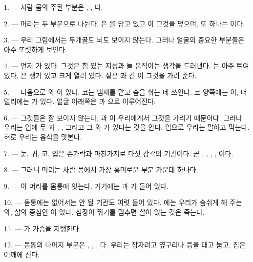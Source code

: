 \VUsaut{3.0mm}

1. --- 사람 몸의 주된 부분은 , , 다.

2. --- 머리는 두 부분으로 나뉜다. 은 를 담고 있고
이 그것을 덮으며, 또 하나는 이다.

3. --- 우리 그림에서는 두개골도 뇌도 보이지 않는다. 그러나 얼굴의 중요한 부분들은 아주
또렷하게 보인다.

4. --- 먼저 가 있다. 그것은 힘 있는 지성과 늘 움직이는 생각을 드러낸다.
는 아주 트여 있다. 은 생기 있고 크게 열려 있다. 짙은
과 긴 이 그것을 가려 준다.

5. --- 다음으로 와 이 있다. 코는 냄새를 맡고 숨을 쉬는 데
쓰인다. 코 양쪽에는 이, 더 멀리에는 가 있다. 얼굴 아래쪽은
과 으로 이루어진다.

6. --- 그것들은 잘 보이지 않는다. 과 이 우리에게서
그것을 가리기 때문이다. 그러나 우리는 입에 두 과 ,
, 그리고 그 와 가 있다는 것을 안다. 입으로 우리는
말하고 먹는다. 혀로 우리는 음식을 맛본다.

7. --- 눈, 귀, 코, 입은 손가락과 마찬가지로 다섯 감각의 기관이다. 곧 ,
, , , 이다.

8. --- 그러니 머리는 사람 몸에서 가장 흥미로운 부분 가운데 하나다.

\VUsaut{4.4mm}
\VUsaut{3.0mm}

9. --- 이 머리를 몸통에 잇는다. 거기에는 과 가
들어 있다.

10. --- 몸통에는 없어서는 안 될 기관도 여럿 들어 있다. 에는 우리가 숨쉬게
해 주는 와, 삶의 중심인 이 있다. 심장이 뛰기를 멈추면 살아
있는 것은 죽는다.

11. --- 가 가슴을 지탱한다.

12. --- 몸통의 나머지 부분은 , , ,
다. 우리는 잠자려고 옆구리나 등을 대고 눕고, 짐은 어깨에 진다.

